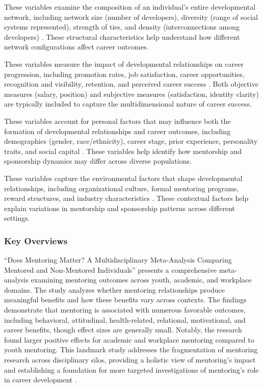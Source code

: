\documentclass[main.tex]{subfiles}
\begin{document}
These variables examine the composition of an individual's entire developmental network, including network size (number of developers), diversity (range of social systems represented), strength of ties, and density (interconnections among developers) \parencite{higgins2023celebrating, cdc2015network}. These structural characteristics help understand how different network configurations affect career outcomes.

These variables measure the impact of developmental relationships on career progression, including promotion rates, job satisfaction, career opportunities, recognition and visibility, retention, and perceived career success \parencite{dubois2011does, togetherplatform2023mentoring}. Both objective measures (salary, position) and subjective measures (satisfaction, identity clarity) are typically included to capture the multidimensional nature of career success.

These variables account for personal factors that may influence both the formation of developmental relationships and career outcomes, including demographics (gender, race/ethnicity), career stage, prior experience, personality traits, and social capital \parencite{pmc2015mapping, alachkar2023sponsor}. These variables help identify how mentorship and sponsorship dynamics may differ across diverse populations.

These variables capture the environmental factors that shape developmental relationships, including organizational culture, formal mentoring programs, reward structures, and industry characteristics \parencite{alachkar2023sponsor, rsna2021mentorship}. These contextual factors help explain variations in mentorship and sponsorship patterns across different settings.

\subsubsection{Key Overviews}

``Does Mentoring Matter? A Multidisciplinary Meta-Analysis Comparing Mentored and Non-Mentored Individuals'' presents a comprehensive meta-analysis examining mentoring outcomes across youth, academic, and workplace domains. The study analyzes whether mentoring relationships produce meaningful benefits and how these benefits vary across contexts. The findings demonstrate that mentoring is associated with numerous favorable outcomes, including behavioral, attitudinal, health-related, relational, motivational, and career benefits, though effect sizes are generally small. Notably, the research found larger positive effects for academic and workplace mentoring compared to youth mentoring. This landmark study addresses the fragmentation of mentoring research across disciplinary silos, providing a holistic view of mentoring's impact and establishing a foundation for more targeted investigations of mentoring's role in career development \parencite{dubois2011does}.
\end{document}
